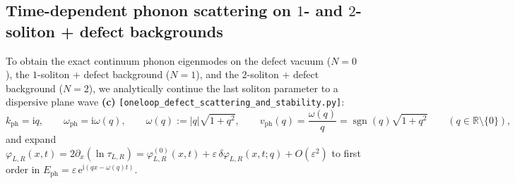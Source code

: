 \documentclass[11pt,a4paper]{article}
\newcommand{\ii}{\mathrm{i}}
\newcommand{\ee}{\mathrm{e}}
\newcommand{\sgn}{\operatorname{sgn}}
\begin{document}
\subsection{Time-dependent phonon scattering on $1$- and $2$-soliton + defect backgrounds}

To obtain the exact continuum phonon eigenmodes on the defect vacuum ($N=0$),
the $1$-soliton + defect background ($N=1$), and the $2$-soliton + defect
background ($N=2$), we analytically continue the last soliton parameter to a
dispersive plane wave \textbf{(c)}
\texttt{[oneloop\_defect\_scattering\_and\_stability.py]}:
\begin{equation}\label{eq:phonon_continuation}
  k_{\mathrm{ph}} = \ii q, \qquad \omega_{\mathrm{ph}} = \ii\omega(q), \qquad
  \omega(q) := |q|\sqrt{1+q^2}, \qquad
  v_{\mathrm{ph}}(q) = \frac{\omega(q)}{q} = \sgn(q)\sqrt{1+q^2} \qquad (q \in \mathbb{R}\setminus\{0\}),
\end{equation}
and expand $\varphi_{L,R}(x,t) = 2\partial_x(\ln\tau_{L,R}) = \varphi_{L,R}^{(0)}(x,t) + \varepsilon\,\delta\varphi_{L,R}(x,t;q) + O(\varepsilon^2)$
to first order in $E_{\mathrm{ph}} = \varepsilon\,\ee^{\ii(qx-\omega(q)t)}$.
\end{document}
